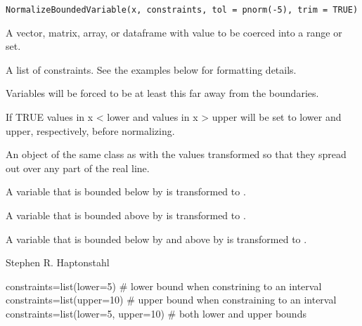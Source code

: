 \documentclass[a4paper]{book}
\begin{document}
%
\begin{Usage}
\begin{verbatim}
NormalizeBoundedVariable(x, constraints, tol = pnorm(-5), trim = TRUE)
\end{verbatim}
\end{Usage}
%
\begin{Arguments}
\begin{ldescription}
\item[\code{x}] A vector, matrix, array, or dataframe with value to be 
coerced into a range or set.

\item[\code{constraints}] A list of constraints.  See the examples below 
for formatting details.

\item[\code{tol}] Variables will be forced to be at least this far away 
from the boundaries.

\item[\code{trim}] If TRUE values in x < lower and values in x > upper 
will be set to lower and upper, respectively, before normalizing.
\end{ldescription}
\end{Arguments}
%
\begin{Value}
An object of the same class as  with the values 
transformed so that they spread out over any part of the real 
line.

A variable  that is bounded below by  is
transformed to .

A variable  that is bounded above by  is
transformed to .

A variable  that is bounded below by  and
above by  is transformed to 
.
\end{Value}
%
\begin{Author}\relax
Stephen R. Haptonstahl 
\end{Author}
%
\begin{Examples}
\begin{ExampleCode}
  constraints=list(lower=5)           # lower bound when constrining to an interval
  constraints=list(upper=10)          # upper bound when constraining to an interval
  constraints=list(lower=5, upper=10) # both lower and upper bounds
\end{ExampleCode}
\end{Examples}
\end{document}
